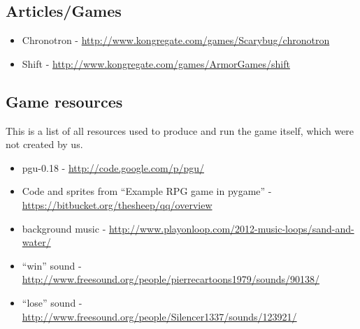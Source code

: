 \subsection{Articles/Games}

\begin{itemize}
\item Chronotron - \url{http://www.kongregate.com/games/Scarybug/chronotron}
\item Shift - \url{http://www.kongregate.com/games/ArmorGames/shift}
\end{itemize}

\subsection{Game resources}
This is a list of all resources used to produce and run the game
itself, which were not created by us.

\begin{itemize}
\item pgu-0.18 - \url{http://code.google.com/p/pgu/}
\item Code and sprites from ``Example RPG game in pygame'' - \url{https://bitbucket.org/thesheep/qq/overview}
\item background music - \url{http://www.playonloop.com/2012-music-loops/sand-and-water/}
\item ``win'' sound - \url{http://www.freesound.org/people/pierrecartoons1979/sounds/90138/}
\item ``lose'' sound - \url{http://www.freesound.org/people/Silencer1337/sounds/123921/}
\end{itemize}



